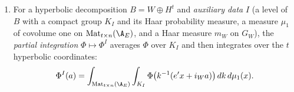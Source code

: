 \begin{definition}
\begin{enumerate}[label=(\alph*)]
$1$ if $v\in S$ and $0$ otherwise; $\Phi$ is \emph{$(S,e)$-good} if $\Phi(x)=\Phi(ex)$ when $x$ is integral outside $S$ and $\Phi(x)=0$
otherwise.
\item For a hyperbolic decomposition $B=W\oplus H^t$ and \emph{auxiliary data} $I$ (a level of $B$ with a compact group $K_I$ and its Haar
probability measure, a measure $\mu_1$ of covolume one on $\mathrm{Mat}_{t\times n}(\A_E)$, and a Haar measure $m_W$ on $G_W$), the \emph{partial
integration} $\Phi\mapsto\Phi^I$ averages $\Phi$ over $K_I$ and then integrates over the $t$ hyperbolic coordinates:
\[
\Phi^I(a)=\int_{\mathrm{Mat}_{t\times n}(\A_E)}\int_{K_I}\Phi\bigl(k^{-1}(e'x+i_Wa)\bigr)\,dk\,d\mu_1(x).
\]
\end{enumerate}
\end{definition}

